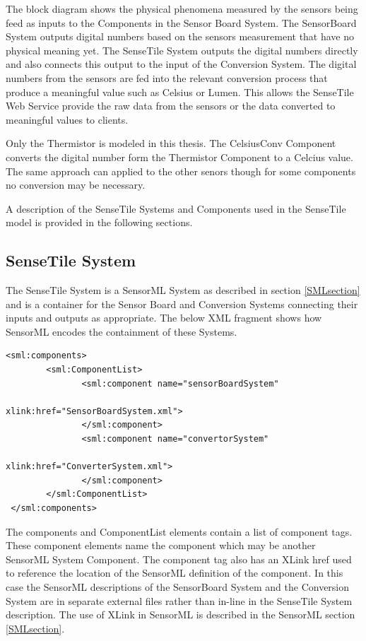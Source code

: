 \documentclass[]{final_report}
\begin{document}
The block diagram shows the physical phenomena measured by the sensors being feed as inputs to the Components in the Sensor Board System. The SensorBoard System outputs digital numbers based on the sensors measurement that have no physical meaning yet. The SenseTile System outputs the digital numbers directly and also connects this output to the input of the Conversion System. The digital numbers from the sensors are fed into the relevant conversion process that produce a meaningful value such as Celsius or Lumen. This allows the SenseTile Web Service provide the raw data from the sensors or the data converted to meaningful values to clients.

Only the Thermistor is modeled in this thesis. The  CelsiusConv Component converts the digital number form the Thermistor Component to a Celcius value. The same approach can applied to the other senors though for some components no conversion may be necessary.

A description of the SenseTile Systems and Components used in the SenseTile model is provided in the following sections.

\subsection{SenseTile System}
The SenseTile System is a SensorML System as described in section \ref{SMLsection} and is a container for the Sensor Board and Conversion Systems connecting their inputs and outputs as appropriate. The below XML fragment shows how SensorML encodes the containment of these Systems. 
\lstset{language=XML,basicstyle=\scriptsize,frame=single}
\begin{lstlisting}
<sml:components>
        <sml:ComponentList>
               <sml:component name="sensorBoardSystem" 
                                          xlink:href="SensorBoardSystem.xml">
               </sml:component>
               <sml:component name="convertorSystem"  
                                          xlink:href="ConverterSystem.xml">
               </sml:component>
        </sml:ComponentList>			   
 </sml:components>
\end{lstlisting}
The components and ComponentList elements contain a list of component tags. These component elements name the component which may be another SensorML System  Component. The component tag also has an XLink href used to reference the location of the SensorML definition of the component.  In this case the SensorML descriptions of the SensorBoard System and the Conversion System are in separate external files rather than in-line in the SenseTile System description. The use of XLink in SensorML is described in the SensorML section \ref{SMLsection}.
\end{document}
